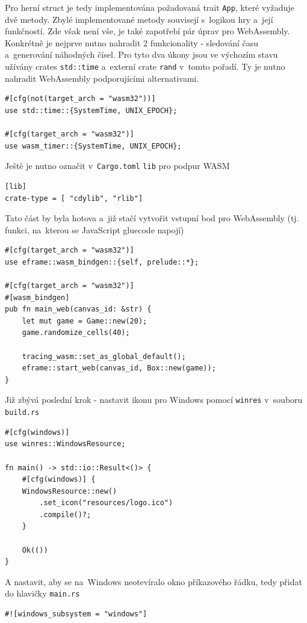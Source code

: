 \documentclass[a4paper, 12pt, twoside]{article} %
\newcommand{\rust}[1]{\texttt{#1}}
\begin{document}
		Pro herní struct je tedy implementována požadovaná trait \rust{App}, které vyžaduje dvě metody. Zbylé implementované metody souvisejí s~logikou hry a~její funkčností. Zde však není vše, je také zapotřebí pár úprav pro WebAssembly. Konkrétně je nejprve nutno nahradit 2 funkcionality - sledování času a~generování náhodných čísel. Pro tyto dva úkony jsou ve výchozím stavu užívány crates \rust{std::time} a~externí crate \rust{rand} v~tomto pořadí. Ty je nutno nahradit WebAssembly podporujícími alternativami.
		\begin{verbatim}
#[cfg(not(target_arch = "wasm32"))]
use std::time::{SystemTime, UNIX_EPOCH};

#[cfg(target_arch = "wasm32")]
use wasm_timer::{SystemTime, UNIX_EPOCH};
		\end{verbatim}
		
		Ještě je nutno označit v~\texttt{Cargo.toml} \texttt{lib} pro podpur WASM
		\begin{verbatim}
[lib]
crate-type = [ "cdylib", "rlib"]
		\end{verbatim}
		
		Tato část by byla hotova a~již stačí vytvořit vstupní bod pro WebAssembly (tj. funkci, na~kterou se JavaScript gluecode napojí)
		\begin{verbatim}
#[cfg(target_arch = "wasm32")]
use eframe::wasm_bindgen::{self, prelude::*};

#[cfg(target_arch = "wasm32")]
#[wasm_bindgen]
pub fn main_web(canvas_id: &str) {
	let mut game = Game::new(20);
	game.randomize_cells(40);

	tracing_wasm::set_as_global_default();
	eframe::start_web(canvas_id, Box::new(game));
}
		\end{verbatim}
		
		Již zbývá poslední krok - nastavit ikonu pro Windows pomocí \rust{winres} v~souboru \texttt{build.rs}
		\begin{verbatim}
#[cfg(windows)]
use winres::WindowsResource;

fn main() -> std::io::Result<()> {
	#[cfg(windows)] {
	WindowsResource::new()
		.set_icon("resources/logo.ico")
		.compile()?;
	}

	Ok(())
}
		\end{verbatim}
		
		A nastavit, aby se na~Windows neotevíralo okno příkazového řádku, tedy přidat do hlavičky \rust{main.rs}
		\begin{verbatim}
#![windows_subsystem = "windows"]
		\end{verbatim}
\end{document}

